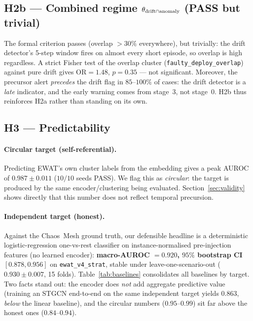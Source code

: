 \subsection{H2b --- Combined regime $\theta_{\text{drift}\cap\text{anomaly}}$ (PASS but trivial)}
The formal criterion passes (overlap $>30\%$ everywhere), but trivially: the drift detector's
5-step window fires on almost every short episode, so overlap is high regardless. A strict Fisher
test of the overlap cluster (\texttt{faulty\_deploy\_overlap}) against pure drift gives
$\text{OR}=1.48$, $p=0.35$ --- not significant. Moreover, the precursor alert \emph{precedes} the
drift flag in $85$--$100\%$ of cases: the drift detector is a \emph{late} indicator, and the early
warning comes from stage~3, not stage~0. H2b thus reinforces H2a rather than standing on its own.

\subsection{H3 --- Predictability}
\paragraph{Circular target (self-referential).}
Predicting EWAT's own cluster labels from the embedding gives a peak AUROC of $0.987\pm0.011$
($10/10$ seeds PASS). We flag this as \emph{circular}: the target is produced by the same
encoder/clustering being evaluated. Section~\ref{sec:validity} shows directly that this number does
not reflect temporal precursion.

\paragraph{Independent target (honest).}
Against the Chaos~Mesh ground truth, our defensible headline is a deterministic logistic-regression
one-vs-rest classifier on instance-normalised pre-injection features (no learned encoder):
\textbf{macro-AUROC $=0.920$, $95\%$ bootstrap CI $[0.878,0.956]$} on
\texttt{ewat\_v4\_strat}, stable under leave-one-scenario-out ($0.930\pm0.007$, 15 folds).
Table~\ref{tab:baselines} consolidates all baselines by target. Two facts stand out: the encoder
does \emph{not} add aggregate predictive value (training an STGCN end-to-end on the same
independent target yields $0.863$, \emph{below} the linear baseline), and the circular numbers
($0.95$--$0.99$) sit far above the honest ones ($0.84$--$0.94$).

